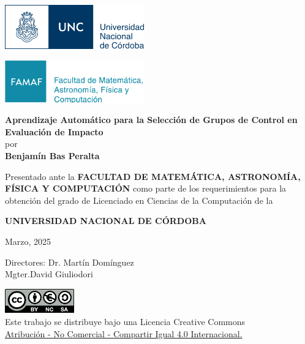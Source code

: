 \begin{titlepage}
\begin{center}

    \noindent
    \begin{minipage}[t]{0.5\linewidth}
        \flushleft
        \includegraphics[width=6cm]{logos/unc.png}
    \end{minipage}%
    \begin{minipage}[t]{0.5\linewidth}
        \flushright
        \includegraphics[width=6cm]{logos/famaf.png}
    \end{minipage}

    \vspace{2cm}

    {\LARGE \textbf{Aprendizaje Automático para la Selección de Grupos de Control en
    Evaluación de Impacto}}
    \\[1cm]
    {\large por}
    \\[0.5cm]
    {\Large \textbf{Benjamín Bas Peralta}}

    \vspace{1cm}

    \noindent
    Presentado ante la \textbf{FACULTAD DE MATEMÁTICA, ASTRONOMÍA, FÍSICA Y COMPUTACIÓN}
    como parte de los requerimientos para la obtención del grado de Licenciado en Ciencias
    de la Computación de la

    \textbf{UNIVERSIDAD NACIONAL DE CÓRDOBA}

    \vspace{0.5cm}

    Marzo, 2025

    \vspace{0.5cm}

    Directores: Dr. Martín Domínguez \\ Mgter.David Giuliodori

    \vfill

    \includegraphics[width=3cm]{logos/creative-commons.png} \\
    \vspace{0.3cm}
    Este trabajo se distribuye bajo una Licencia Creative Commons \\
    \href{https://creativecommons.org/licenses/by-nc-sa/4.0/deed.es}{
        Atribución - No Comercial - Compartir Igual 4.0 Internacional.
    }
\end{center}
\end{titlepage}
